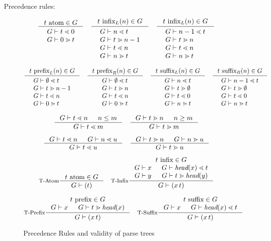 \documentclass{article}
\begin{document}
Precedence rules:

\begin{figure}
  \[
  \inference{\hasfix{t}{\atom}{G}}{\twolines{\sld{G}{t}{0}}{\sgd{G}{0}{t}}}
  \quad
  \inference{\hasfix{t}{\infix{L}{n}}{G}}{\fourlines
    {\sld{G}{n}{t}}
    {\sgd{G}{t}{n-1}}
    {\sld{G}{t}{n}}
    {\sgd{G}{n}{t}}}
  \quad
  \inference{\hasfix{t}{\infix{L}{n}}{G}}{\fourlines
    {\sld{G}{n-1}{t}}
    {\sgd{G}{t}{n}}
    {\sld{G}{t}{n}}
    {\sgd{G}{n}{t}}}
  \]
  
  \[
  \inference{\hasfix{t}{\prefix{L}{n}}{G}}{\fourlines
    {\sld{G}{\emptyset}{t}}
    {\sgd{G}{t}{n-1}}
    {\sld{G}{t}{n}}
    {\sgd{G}{0}{t}}}
  \quad
  \inference{\hasfix{t}{\prefix{R}{n}}{G}}{\fourlines
    {\sld{G}{\emptyset}{t}}
    {\sgd{G}{t}{n}}
    {\sld{G}{t}{n}}
    {\sgd{G}{0}{t}}}
  \quad
  \inference{\hasfix{t}{\suffix{L}{n}}{G}}{\fourlines
    {\sld{G}{n}{t}}
    {\sgd{G}{t}{\emptyset}}
    {\sld{G}{t}{0}}
    {\sgd{G}{n}{t}}}
  \quad
  \inference{\hasfix{t}{\suffix{R}{n}}{G}}{\fourlines
    {\sld{G}{n-1}{t}}
    {\sgd{G}{t}{\emptyset}}
    {\sld{G}{t}{0}}
    {\sgd{G}{n}{t}}}
  \]

  \[
    \inference
      {\sld{G}{t}{n} & n \leq m}
      {\sld{G}{t}{m}}
    \quad
    \inference
      {\sgd{G}{t}{n} & n \geq m}
      {\sgd{G}{t}{m}}
  \]
  
  \[
  \inference{\sld{G}{t}{n} & \sld{G}{n}{u}}{\sld{G}{t}{u}}
  \quad
  \inference{\sgd{G}{t}{n} & \sgd{G}{n}{u}}{\sgd{G}{t}{u}}
  \]
  
  \[
  \inference[T-Atom]{\hasfix{t}{\atom}{G}}{\stree{G}{(t)}}
  \quad
  \inference[T-Infix]
    {\hasfix{t}{\infix{}{}}{G} \\ \stree{G}{x} & \sld{G}{\head{x}}{t}
     \\ \stree{G}{y} & \sgd{G}{t}{\head{y}}}
    {\stree{G}{(x\,t)}}
  \]
  
  \[
  \inference[T-Prefix]
    {\hasfix{t}{\prefix{}{}}{G} \\ \stree{G}{x} & \sgd{G}{t}{\head{x}}}
    {\stree{G}{(x\,t)}}
  \quad
  \inference[T-Suffix]
    {\hasfix{t}{\suffix{}{}}{G} \\ \stree{G}{x} & \sld{G}{\head{x}}{t}}
    {\stree{G}{(x\,t)}}
  \]

\caption{Precedence Rules and validity of parse trees}
\end{figure}
\end{document}
